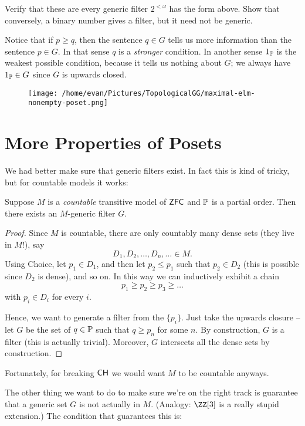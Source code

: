 \begin{exercise}
	Verify that these are every generic filter $2^{<\omega}$ has the form above.
	Show that conversely, a binary number gives a filter, but it need not be generic.
\end{exercise}

Notice that if $p \ge q$, then the sentence $q \in G$ tells us more information than the sentence $p \in G$.
In that sense $q$ is a \emph{stronger} condition.
In another sense $1_\mathbb P$ is the weakest possible condition,
because it tells us nothing about $G$; we always have $1_\mathbb P \in G$
since $G$ is upwards closed.



\begin{figure}[ht]
	\centering
	\texttt{[image: /home/evan/Pictures/TopologicalGG/maximal-elm-nonempty-poset.png]}
\end{figure}


\section{More Properties of Posets}
We had better make sure that generic filters exist.
In fact this is kind of tricky, but for countable models it works:
\begin{lemma}
	Suppose $M$ is a \emph{countable} transitive model of $\mathsf{ZFC}$
	and $\mathbb P$ is a partial order.
	Then there exists an $M$-generic filter $G$.
\end{lemma}
\begin{proof}
	Since $M$ is countable, there are only countably many dense sets (they live in $M$!),
	say \[ D_1, D_2, \ldots, D_n, \ldots \in M. \]
	Using Choice,
	let $p_1 \in D_1$, and then let $p_2 \le p_1$ such that $p_2 \in D_2$
	(this is possible since $D_2$ is dense), and so on.
	In this way we can inductively exhibit a chain
	\[ p_1 \ge p_2 \ge p_3 \ge \dots \]
	with $p_i \in D_i$ for every $i$.

	Hence, we want to generate a filter from the $\{p_i\}$.
	Just take the upwards closure -- let $G$ be the set of $q \in \mathbb P$ such that $q \ge p_n$ for some $n$.
	By construction, $G$ is a filter (this is actually trivial).
	Moreover, $G$ intersects all the dense sets by construction.
\end{proof}
Fortunately, for breaking $\mathsf{CH}$ we would want $M$ to be countable anyways.

The other thing we want to do to make sure we're on the right track is guarantee
that a generic set $G$ is not actually in $M$.
(Analogy: $\ZZ[3]$ is a really stupid extension.)
The condition that guarantees this is:


